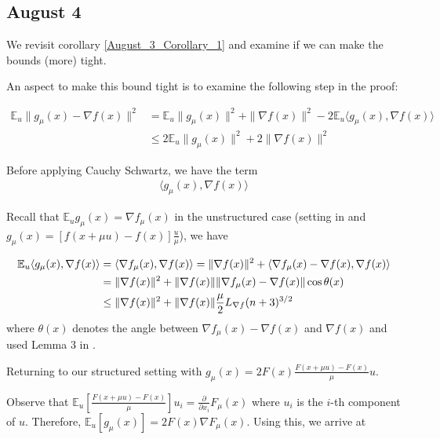 \documentclass{article}
\begin{document}
\subsection{August 4} \label{August_4_journal_entry}

We revisit corollary \ref{August_3_Corollary_1} and examine if we can make the bounds (more) tight. \newline 

An aspect to make this bound tight is to examine the following step in the proof:

\begin{align*}
\mathbb{E}_u\|g_{\mu}(x) - \nabla f(x)\|^2 & = \mathbb{E}_u\|g_{\mu}(x)\|^2 + \|\nabla f(x)\|^2 -2\mathbb{E}_u\langle g_{\mu}(x),\nabla f(x) \rangle \\ &  \leq 2\mathbb{E}_u\|g_{\mu}(x)\|^2 + 2 \|\nabla f(x)\|^2
\end{align*}

Before applying Cauchy Schwartz, we have the term
\begin{align*}
\langle g_{\mu}(x),\nabla f(x)\rangle 
\end{align*}

Recall that $\mathbb{E}_ug_{\mu}(x) = \nabla f_{\mu}(x)$ in the unstructured case (setting in \cite{Nesterov2015} and $g_{\mu}(x) = [f(x+\mu u)-f(x)]\frac{u}{\mu}$), we have

\begin{align}
\mathbb{E}_u\langle g_{\mu}(x),\nabla f(x)\rangle & = \langle \nabla f_{\mu}(x), \nabla f(x)\rangle = \|\nabla f(x)\|^2 + \langle \nabla f_{\mu}(x)-\nabla f(x),\nabla f(x)\rangle \notag \\ & = \|\nabla f(x)\|^2 + \|\nabla f(x)\|\|\nabla f_{\mu}(x) - \nabla f(x)\|\cos \theta(x) \notag \\ & \leq \|\nabla f(x)\|^2 + \|\nabla f(x)\|\frac{\mu}{2}L_{\nabla f}(n+3)^{3/2} \label{August_4_equation_1}
\end{align}
where $\theta(x)$ denotes the angle between $\nabla f_{\mu}(x)-\nabla f(x)$ and $\nabla f(x)$ and used Lemma $3$ in \cite{Nesterov2015}. \newline 

Returning to our structured setting with $g_{\mu}(x) = 2F(x)\frac{F(x+\mu u)-F(x)}{\mu}u$. \newline 

Observe that $\mathbb{E}_u\left[\frac{F(x+\mu u) - F(x)}{\mu}\right]u_i = \frac{\partial}{\partial x_i}F_{\mu}(x)$ where $u_i$ is the $i$-th component of $u$. Therefore, $\mathbb{E}_u[g_{\mu}(x)] = 2F(x)\nabla F_{\mu}(x)$. Using this, we arrive at 
\end{document}
